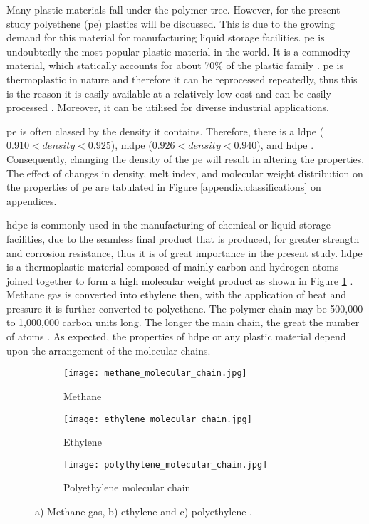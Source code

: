 Many plastic materials fall under the polymer tree. However, for the present study polyethene (\acrshort{pe}) plastics will be discussed. This is due to the growing demand for this material for manufacturing liquid storage facilities. \acrshort{pe} is undoubtedly the most popular plastic material in the world. It is a commodity material, which statically accounts for about 70\% of the plastic family \cite{roslan2013effect}.  \acrshort{pe} is thermoplastic in nature and therefore it can be reprocessed repeatedly, thus this is the reason it is easily available at a relatively low cost and can be easily processed \cite{kurtz2009cross}. Moreover, it can be utilised for diverse industrial applications. 

\acrshort{pe} is often classed by the density it contains. Therefore, there is a \Acrfull{ldpe} ($0.910 < density < 0.925$), \Acrfull{mdpe} ($0.926 < density < 0.940$), and \Acrfull{hdpe} \cite{gabriel1998history}. Consequently, changing the density of the \acrshort{pe} will result in altering the properties. The effect of changes in density, melt index, and molecular weight distribution on the properties of \acrshort{pe} are tabulated in Figure \ref{appendix:classifications} on appendices.

\acrshort{hdpe} is commonly used in the manufacturing of chemical or liquid storage facilities, due to the seamless final product that is produced, for greater strength and corrosion resistance, thus it is of great importance in the present study. \acrshort{hdpe} is a thermoplastic material composed of mainly carbon and hydrogen atoms joined together to form a high molecular weight product as shown in Figure \ref{ch3:figure:molecular_chains} \cite{gabriel1998history}. Methane gas is converted into ethylene then, with the application of heat and pressure it is further converted to polyethene. The polymer chain may be 500,000 to 1,000,000 carbon units long. The longer the main chain, the great the number of atoms \cite{gabriel1998history}. As expected, the properties of \acrshort{hdpe} or any plastic material depend upon the arrangement of the molecular chains.
               
\begin{figure}[H]
\centering

\begin{subfigure}{.3\textwidth}
    \centering
    \texttt{[image: methane\_molecular\_chain.jpg]}
    \caption{Methane}
\end{subfigure}
\begin{subfigure}{.3\textwidth}
    \centering
    \texttt{[image: ethylene\_molecular\_chain.jpg]}
    \caption{Ethylene}
\end{subfigure}
\begin{subfigure}{.65\textwidth}
    \vspace{1.5em}
    \centering
    \texttt{[image: polythylene\_molecular\_chain.jpg]}
    \caption{Polyethylene molecular chain}
\end{subfigure}

\caption{a) Methane gas, b) ethylene and c) polyethylene \cite{gabriel1998history}.}
\label{ch3:figure:molecular_chains}
\end{figure}

